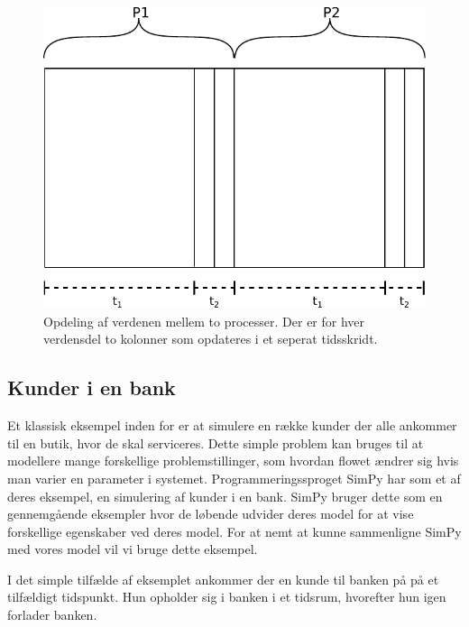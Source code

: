 \begin{figure}
  \begin{center}
  \includegraphics[scale=0.75]{images/wator}
  \caption{Opdeling af verdenen mellem to processer. Der er for hver verdensdel 
  to kolonner som opdateres i et seperat tidsskridt.}
  \label{fig:wator}
  \end{center}
\end{figure}

\subsection{Kunder i en bank} Et klassisk eksempel inden for \des er at simulere  
en række kunder der alle ankommer til en butik, hvor de skal serviceres. Dette 
simple problem kan bruges til at modellere mange forskellige 
problemstillinger, som hvordan flowet ændrer sig hvis man varier en parameter 
i systemet. Programmeringssproget SimPy har som et af deres eksempel, en 
simulering af kunder i en bank. SimPy bruger dette som en gennemgående 
eksempler hvor de løbende udvider deres model for at vise forskellige 
egenskaber ved deres model. For at nemt at kunne sammenligne SimPy  med vores 
model vil vi bruge dette eksempel.

I det simple tilfælde af eksemplet ankommer der en kunde til banken på på et 
tilfældigt tidspunkt. Hun opholder sig i banken i et tidsrum, hvorefter hun 
igen forlader banken.

